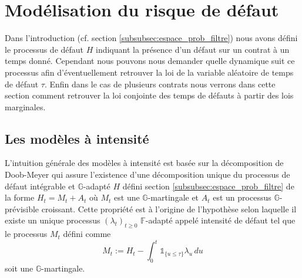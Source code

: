 \section{Modélisation du risque de défaut}

Dans l'introduction (cf. section \ref{subsubsec:espace_prob_filtre}) nous avons défini le
processus de défaut $H$ indiquant la présence d'un défaut sur un contrat à un temps donné.
Cependant nous pouvons nous demander quelle dynamique suit ce processus afin d'éventuellement
retrouver la loi de la variable aléatoire de temps de défaut $\tau$. Enfin dans le cas de plusieurs
contrats nous verrons dans cette section comment retrouver la loi conjointe des temps de défauts
à partir des lois marginales.

\subsection{Les modèles à intensité}

L'intuition générale des modèles à intensité est basée sur la décomposition de Doob-Meyer
qui assure l'existence d'une décomposition unique du processus de défaut intégrable et $\mathbb{G}$-adapté $H$ défini section
\ref{subsubsec:espace_prob_filtre} de la forme $H_t = M_t + A_t$ où $M_t$ est une
$\mathbb{G}$-martingale et $A_t$ est un processus $\mathbb{G}$-prévisible croissant. Cette propriété
est à l'origine de l'hypothèse selon laquelle il existe un unique processus
$(\lambda_t)_{t \ge 0}$ $\mathbb{F}$-adapté appelé intensité de défaut tel que le processus
$M_t$ défini comme
\begin{equation}
    M_t := H_t - \int_0^t \mathbb{1}_{ \{ u \le \tau \} } \lambda_u \, du
\end{equation}
soit une $\mathbb{G}$-martingale. \cite{defaut_intensite}

